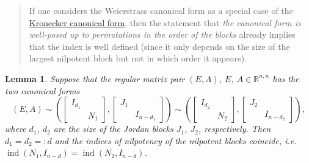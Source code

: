 \documentclass[]{book}
\newenvironment {JHSAYS} [0] {\begin{quote}\color{jhsc}} {\end{quote}}
\newtheorem{lemma}{Lemma}[chapter]
\theoremstyle{definition}
\theoremstyle{definition}
\theoremstyle{definition}
\theoremstyle{definition}
\theoremstyle{remark}
\begin{document}
\begin{JHSAYS}
If one considers the Weierstrass canonical form as a special case of the
\protect\hyperlink{thm:kcf}{Kronecker canonical form}, then the
statement that \emph{the canonical form is well-posed up to permutations
in the order of the blocks} already implies that the index is well
defined (since it only depends on the size of the largest nilpotent
block but not in which order it appears).
\end{JHSAYS}

\begin{lemma}
\protect\hypertarget{lem:kronecker-index-well-defined}{}{\label{lem:kronecker-index-well-defined} }Suppose that the regular matrix pair \((E, A)\), \(E\), \(A\in \mathbb R^{n,n}\) has the two canonical forms
\[
(E, A) \sim 
\left (
\begin{bmatrix}
I_{d_1} \\
& N_1
\end{bmatrix}
,
\begin{bmatrix}
J_1 \\
& I_{n-d_1}
\end{bmatrix}
\right )
\sim 
\left (
\begin{bmatrix}
I_{d_2} \\
& N_2
\end{bmatrix}
,
\begin{bmatrix}
J_2 \\
& I_{n-d_2}
\end{bmatrix}
\right ),
\]
where \(d_1\), \(d_2\) are the size of the Jordan blocks \(J_1\), \(J_2\), respectively. Then \(d_1=d_2=:d\) and the indices of nilpotency of the nilpotent blocks coincide, i.e.~\(\operatorname{ind}(N_1, I_{n-d}) = \operatorname{ind}(N_2, I_{n-d})\).
\end{lemma}
\end{document}
